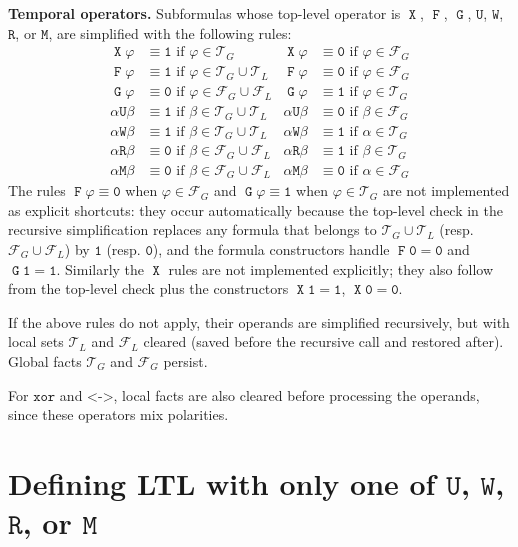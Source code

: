 \documentclass[a4paper,twoside,10pt,DIV=12]{scrreprt}
\DeclareMathOperator{\F}{\texttt{F}}
\DeclareMathOperator{\G}{\texttt{G}}
\newcommand{\U}{\mathbin{\texttt{U}}}
\newcommand{\R}{\mathbin{\texttt{R}}}
\DeclareMathOperator{\X}{\texttt{X}}
\newcommand{\M}{\mathbin{\texttt{M}}}
\newcommand{\W}{\mathbin{\texttt{W}}}
\newcommand{\XOR}{\mathbin{\texttt{xor}}}
\newcommand{\EQUIV}{\mathbin{\texttt{<->}}}
\newcommand{\0}{\texttt{0}}
\newcommand{\1}{\texttt{1}}
\begin{document}
\medskip\noindent
\textbf{Temporal operators.}
Subformulas whose top-level operator is
$\X$, $\F$, $\G$, $\U$, $\W$, $\R$, or $\M$,
are simplified with the following rules:
\begin{align*}
  \X\varphi &\equiv \1 \text{ if } \varphi\in\mathcal{T}_G &
  \X\varphi &\equiv \0 \text{ if } \varphi\in\mathcal{F}_G \\
  \F\varphi &\equiv \1 \text{ if } \varphi\in\mathcal{T}_G\cup\mathcal{T}_L &
  \F\varphi &\equiv \0 \text{ if } \varphi\in\mathcal{F}_G \\
  \G\varphi &\equiv \0 \text{ if } \varphi\in\mathcal{F}_G\cup\mathcal{F}_L &
  \G\varphi &\equiv \1 \text{ if } \varphi\in\mathcal{T}_G \\
  \alpha\U\beta &\equiv \1 \text{ if } \beta\in\mathcal{T}_G\cup\mathcal{T}_L &
  \alpha\U\beta &\equiv \0 \text{ if } \beta\in\mathcal{F}_G \\
  \alpha\W\beta &\equiv \1 \text{ if } \beta\in\mathcal{T}_G\cup\mathcal{T}_L &
  \alpha\W\beta &\equiv \1 \text{ if } \alpha\in\mathcal{T}_G \\
  \alpha\R\beta &\equiv \0 \text{ if } \beta\in\mathcal{F}_G\cup\mathcal{F}_L &
  \alpha\R\beta &\equiv \1 \text{ if } \beta\in\mathcal{T}_G \\
  \alpha\M\beta &\equiv \0 \text{ if } \beta\in\mathcal{F}_G\cup\mathcal{F}_L &
  \alpha\M\beta &\equiv \0 \text{ if } \alpha\in\mathcal{F}_G
\end{align*}
The rules $\F\varphi\equiv\0$ when $\varphi\in\mathcal{F}_G$ and
$\G\varphi\equiv\1$ when $\varphi\in\mathcal{T}_G$ are not implemented
as explicit shortcuts: they occur automatically because the top-level
check in the recursive simplification replaces any formula that belongs
to $\mathcal{T}_G\cup\mathcal{T}_L$ (resp. $\mathcal{F}_G\cup\mathcal{F}_L$)
by $\1$ (resp. $\0$), and the formula constructors handle $\F\0=\0$
and $\G\1=\1$.
Similarly the $\X$ rules are not implemented explicitly; they also
follow from the top-level check plus the constructors $\X\1=\1$, $\X\0=\0$.

If the above rules do not apply, their operands are simplified
recursively, but with local sets $\mathcal{T}_L$ and $\mathcal{F}_L$
cleared (saved before the recursive call and restored after).  Global
facts $\mathcal{T}_G$ and $\mathcal{F}_G$ persist.

For $\XOR$ and $\EQUIV$, local facts are also cleared before
processing the operands, since these operators mix polarities.


\appendix
\chapter{Defining LTL with only one of $\U$, $\W$, $\R$, or $\M$}
\label{sec:ltl-equiv}
\end{document}
